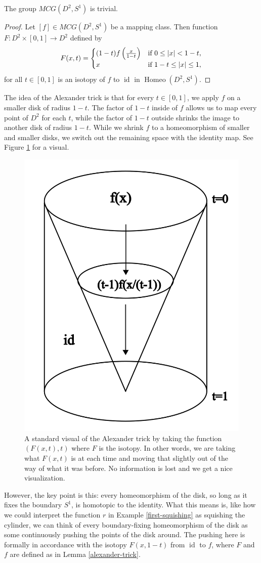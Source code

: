 \documentclass{amsart}
\DeclareMathOperator{\id}{id}
\DeclareMathOperator{\Homeo}{Homeo}
\begin{document}
\begin{lemma}\label{alexander-trick}
   The group \(MCG(D^2, S^1)\) is trivial.
\end{lemma}
\begin{proof}
	Let \([f]\in MCG(D^2, S^1)\) be a mapping class. Then function \(F:
	D^2\times [0, 1]\to D^2\) defined by
	\[
	   F(x, t) = 
		\begin{cases}
			(1-t)f\left(\frac{x}{1-t}\right) &\text{if } 0\le \abs{x} < 1-t,\\
			x &\text{if } 1-t\le\abs{x}\le 1,
	   \end{cases}
	\] 
	for all \(t\in[0, 1]\) is an isotopy of \(f\) to \(\id\) in \(\Homeo(D^2,
	S^1)\).
\end{proof}
The idea of the Alexander trick is that for every \(t\in[0, 1]\), we apply
\(f\) on a smaller disk of radius \(1-t\). The factor of \(1-t\) inside of
\(f\) allows us to map every point of \(D^2\) for each \(t\), while the factor
of \(1-t\) outside shrinks the image to another disk of radius \(1-t\). While
we shrink \(f\) to a homeomorphism of smaller and smaller disks, we switch out
the remaining space with the identity map. See Figure \ref{Alex-trick-pic} for
a visual.

\begin{figure}
   \centering
	\includegraphics[width = .35\textwidth]{Inkscape Files/alexander-trick.png}
	\caption{A standard visual of the Alexander trick by taking the function
		\((F(x, t),	t)\) where \(F\) is the isotopy. In other words, we are
		taking what \(F(x, t)\) is at each time and moving that slightly out of
		the way of what it was before. No information is lost and we get a nice
		visualization.}
	\label{Alex-trick-pic}
\end{figure}

However, the key point is this: every homeomorphism of the disk, so long as it
fixes the boundary \(S^1\), is homotopic to the identity. What this means is,
like how we could interpret the function \(r\) in Example \ref{first-squishing} as
squishing the cylinder, we can think of every boundary-fixing homeomorphism of
the disk as some continuously pushing the points of the disk around. The
pushing here is formally in accordance with the isotopy \(F(x, 1-t)\) from
\(\id\) to \(f\), where \(F\) and \(f\) are defined as in Lemma
\ref{alexander-trick}.
\end{document}
